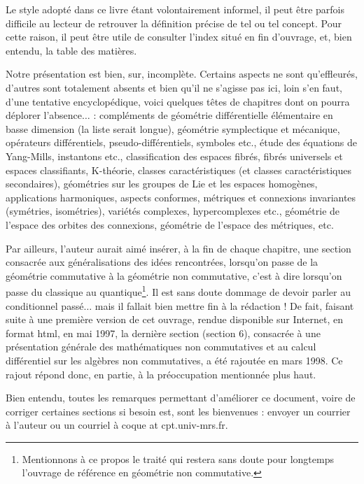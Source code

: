 Le style adopt\'e dans ce livre \'etant volontairement informel, il 
peut \^etre parfois difficile au lecteur de retrouver la d\'efinition 
pr\'ecise de tel ou tel concept. Pour cette raison, il peut \^etre 
utile de consulter l'index situ\'e en fin d'ouvrage, et, bien 
entendu, la table des mati\`eres.

Notre pr\'esentation est bien, sur, incompl\`ete. Certains aspects ne sont qu'effleur\'es,
d'autres sont totalement absents et bien qu'il ne s'agisse pas 
ici, loin s'en faut, d'une tentative encyclop\'edique, voici
quelques t\^etes de chapitres dont
on pourra d\'eplorer l'absence$\ldots$ :
compl\'ements de g\'eom\'etrie diff\'erentielle \'el\'ementaire en 
basse dimension (la liste serait longue),
g\'eom\'etrie symplectique et m\'ecanique, 
op\'erateurs diff\'erentiels, pseudo-diff\'erentiels, symboles etc.,
\'etude des \'equations de Yang-Mills, instantons etc.,
classification des espaces fibr\'es, fibr\'es universels et espaces classifiants,
K-th\'eorie,
classes caract\'eristiques (et classes caract\'eristiques secondaires),
g\'eom\'etries sur les groupes de Lie et les espaces 
homog\`enes,
applications harmoniques,
aspects conformes,
m\'etriques et connexions invariantes (sym\'etries, isom\'etries),
vari\'et\'es complexes, hypercomplexes etc.,
g\'eom\'etrie de l'espace des orbites des connexions,
g\'eom\'etrie de l'espace des m\'etriques,
etc.


Par ailleurs, l'auteur aurait aim\'e ins\'erer, \`a la fin de chaque 
chapitre, une section consacr\'ee aux g\'en\'eralisations des id\'ees
rencontr\'ees, lorsqu'on passe de la g\'eom\'etrie commutative \`a la g\'eom\'etrie
non commutative, c'est \`a dire lorsqu'on passe du classique au quantique\footnote{Mentionnons
\`a ce propos le trait\'e \cite{ACbook} qui restera sans
doute pour longtemps l'ouvrage de r\'ef\'erence en g\'eom\'etrie non
commutative.}.
Il est sans doute dommage de devoir parler au conditionnel pass\'e$\ldots$
mais il fallait bien mettre fin \`a la r\'edaction ! 
De fait, faisant suite \`a une premi\`ere version de cet ouvrage, rendue 
disponible sur Internet, en format html, en mai 1997, la derni\`ere 
section (section 6), consacr\'ee \`a une pr\'esentation g\'en\'erale 
des math\'ematiques non commutatives et au calcul diff\'erentiel sur 
les alg\`ebres non commutatives, a \'et\'e rajout\'ee  en mars 1998. Ce 
rajout r\'epond donc, en partie, \`a la pr\'eoccupation mentionn\'ee plus haut.

 Bien entendu, toutes les remarques permettant d'am\'eliorer ce 
 document, voire de corriger certaines sections si besoin est, sont les 
 bienvenues : envoyer un courrier \`a l'auteur ou un courriel 
\`a coque at cpt.univ-mrs.fr.

